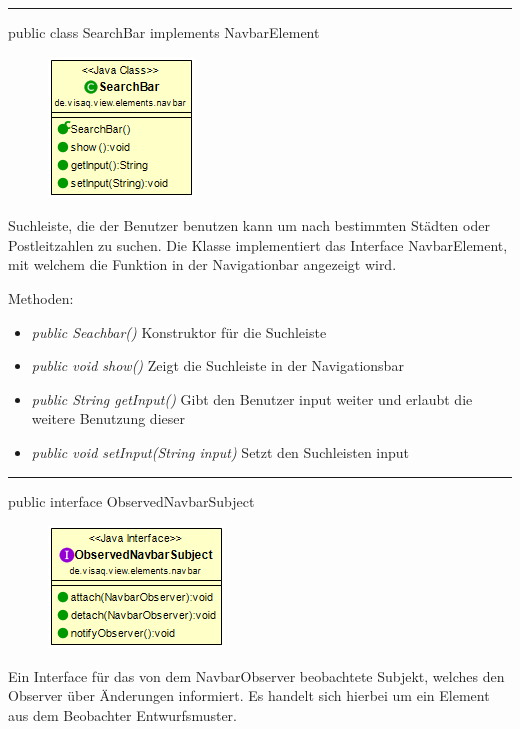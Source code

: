 \rule{\textwidth}{0.4pt}
public class SearchBar implements NavbarElement

\begin{minipage}{0.3\textwidth}
    \begin{figure}[H]
        \includegraphics[scale = 0.6]{media/frontend/view/de.view.elements.navbar/SearchbarClass.png}
    \end{figure}
    \end{minipage} \hfill
    \begin{minipage}{0.6\textwidth}
Suchleiste, die der Benutzer benutzen kann um nach bestimmten Städten oder Postleitzahlen zu suchen. Die Klasse implementiert das Interface NavbarElement, mit welchem die Funktion in der Navigationbar angezeigt wird.
\end{minipage}

Methoden:
\begin{itemize}
    \item \emph{public Seachbar()} Konstruktor für die Suchleiste
    \item \emph{public void show()} Zeigt die Suchleiste in der Navigationsbar
    \item \emph{public String getInput()} Gibt den Benutzer input weiter und erlaubt die weitere Benutzung dieser
    \item \emph{public void setInput(String input)} Setzt den Suchleisten input
\end{itemize}

\rule{\textwidth}{0.4pt}
public interface ObservedNavbarSubject

\begin{minipage}{0.3\textwidth}
    \begin{figure}[H]
        \includegraphics[scale = 0.6]{media/frontend/view/de.view.elements.navbar/ObservedNavbarSubjectClass.png}
    \end{figure}
    \end{minipage} \hfill
\begin{minipage}{0.6\textwidth}
Ein Interface für das von dem NavbarObserver beobachtete Subjekt, welches den Observer über Änderungen informiert.  Es handelt sich hierbei um ein Element aus dem Beobachter Entwurfsmuster.
\end{minipage}

